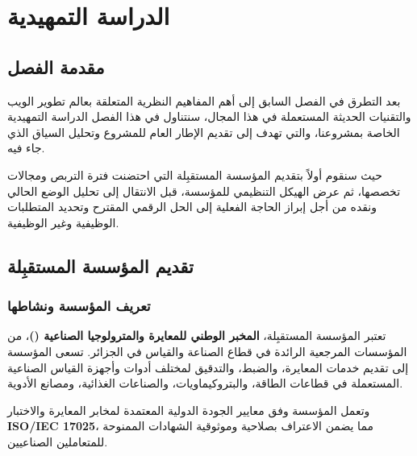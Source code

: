 \documentclass{bts-report-ar}
\begin{document}
\chapter{الدراسة التمهيدية}

\section*{مقدمة الفصل}
بعد التطرق في الفصل السابق إلى أهم المفاهيم النظرية المتعلقة بعالم تطوير الويب والتقنيات الحديثة المستعملة في هذا المجال، سنتناول في هذا الفصل الدراسة التمهيدية الخاصة بمشروعنا، والتي تهدف إلى تقديم الإطار العام للمشروع وتحليل السياق الذي جاء فيه. 

حيث سنقوم أولاً بتقديم المؤسسة المستقبِلة التي احتضنت فترة التربص ومجالات تخصصها، ثم عرض الهيكل التنظيمي للمؤسسة، قبل الانتقال إلى تحليل الوضع الحالي ونقده من أجل إبراز الحاجة الفعلية إلى الحل الرقمي المقترح وتحديد المتطلبات الوظيفية وغير الوظيفية.

\section{تقديم المؤسسة المستقبِلة}
\subsection{تعريف المؤسسة ونشاطها}
تعتبر المؤسسة المستقبِلة، \textbf{المخبر الوطني للمعايرة والمترولوجيا الصناعية ()}، من المؤسسات المرجعية الرائدة في قطاع الصناعة والقياس في الجزائر. تسعى المؤسسة إلى تقديم خدمات المعايرة، والضبط، والتدقيق لمختلف أدوات وأجهزة القياس الصناعية المستعملة في قطاعات الطاقة، والبتروكيماويات، والصناعات الغذائية، ومصانع الأدوية.

وتعمل المؤسسة وفق معايير الجودة الدولية المعتمدة لمخابر المعايرة والاختبار \textbf{ISO/IEC 17025}، مما يضمن الاعتراف بصلاحية وموثوقية الشهادات الممنوحة للمتعاملين الصناعيين.
\end{document}
